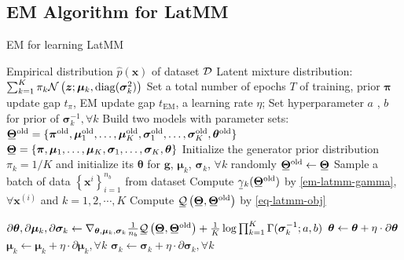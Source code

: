 \subsection{EM Algorithm for LatMM}
\begin{algorithm}[!t]
  \caption{EM for learning LatMM}\label{flow-algo-sem}
  \begin{algorithmic}[1]
     Empirical distribution $\hat{p}(\bm{x})$ of dataset $\mathcal{D}$
    \STATE Latent mixture distribution: \\ 
     $\sum_{k=1}^{K}\pi_k \mathcal{N}\left(\bm{z}; \bm{\mu}_k, \mathrm{diag}(\bm{\sigma}_k^2)\right)$
    \STATE Set a total number of epochs $T$ of training, prior $\bm{\pi}$ update gap $t_{\pi}$, EM update gap $t_{\mathrm{EM}}$, a learning rate $\eta$; Set hyperparameter $a$ , $b$ for prior of
    $\bm{\sigma}_k^{-1}, \forall k$
    \STATE Build two models with parameter sets:\\
     $\ubar{\bm{\Theta}}^{\mathrm{old}}=\{ \bm{\pi}^{\mathrm{old}},
    \bm{\mu}_1^{\mathrm{old}},\hdots, \bm{\mu}_K^{\mathrm{old}}, \bm{\sigma}_1^{\mathrm{old}},\hdots,
    \bm{\sigma}_K^{\mathrm{old}}, \bm{\theta}^{\mathrm{old}} \}$ \\
     $\ubar{\bm{\Theta}} = \{ \bm{\pi},
    \bm{\mu}_1,\hdots, \bm{\mu}_K, \bm{\sigma}_1,\hdots,
    \bm{\sigma}_K, \bm{\theta} \}$
    \STATE Initialize the generator prior distribution $\pi_k = 1/K$ and initialize its $\bm{\theta}$ for $\bm{g}$, $\bm{\mu}_k$, $\bm{\sigma}_k$, $\forall k$ randomly
    \STATE $\ubar{\bm{\Theta}}^{\mathrm{old}} \gets \ubar{\bm{\Theta}}$
    \STATE Sample a batch of data $\left\{ \bm{x}^{i}
    \right\}_{i=1}^{n_b}$ from dataset
    \STATE Compute $\ubar{\gamma}_k(\ubar{\bm{\Theta}}^{\mathrm{old}})$ by \eqref{em-latmm-gamma}, $\forall \bm{x}^{(i)}$ and $k=1, 2, \cdots, K$ %
    \STATE Compute
    $\ubar{\Qq}\left(\ubar{\bm{\Theta}},\ubar{\bm{\Theta}}^{\mathrm{old}}\right)$ by \eqref{eq-latmm-obj}%

    \STATE $\partial{\bm{\th}}, \partial{\bm{\mu}_k}, \partial{\bm{\sigma}_k}\gets 
    \nabla_{\bm{\theta}, \bm{\mu}_k, \bm{\sigma}_k} 
    \frac{1}{n_{b}}\ubar{\Qq}\left(\ubar{\bm{\Theta}},\ubar{\bm{\Theta}}^{\mathrm{old}}\right)
    +\frac{1}{K}
    \log\prod_{k=1}^K
    \Gamma(\bm{\sigma}_k^{-1};
    a, b)$ %
    \STATE $\bm{\theta} \gets \bm{\theta} + \eta \cdot \partial{\bm{\theta}}$
    \STATE $\bm{\mu}_k \gets \bm{\mu}_k + \eta \cdot \partial{\bm{\mu}_k}, \forall k$
    \STATE $\bm{\sigma}_k \gets \bm{\sigma}_k + \eta \cdot \partial{\bm{\sigma}_k},
    \forall k$
    \ENDFOR


\end{algorithmic}
\end{algorithm}

